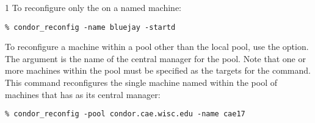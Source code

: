 \begin{ManPage}{\label{man-condor-reconfig}}{1}
To reconfigure only the  on a named machine:
\begin{verbatim}
% condor_reconfig -name bluejay -startd
\end{verbatim}

To reconfigure a machine within a pool
other than the local pool, use the  option.
The argument is the name of the central manager for the pool.
Note that one or more machines within the pool must be
specified as the targets for the command.
This command reconfigures
the single machine named  within the
pool of machines that has  as
its central manager:
\begin{verbatim}
% condor_reconfig -pool condor.cae.wisc.edu -name cae17
\end{verbatim}

\end{ManPage}
